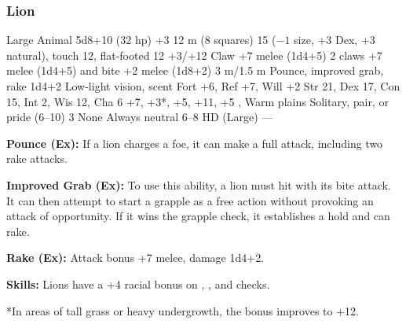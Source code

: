\subsubsection{Lion}
\begin{MonsterStats}
{Large Animal}
{5d8+10 (32 hp)}
{+3}
{12 m (8 squares)}
{15 ($-1$ size, +3 Dex, +3 natural), touch 12, flat-footed 12}
{+3/+12}
{Claw +7 melee (1d4+5)}
{2 claws +7 melee (1d4+5) and bite +2 melee (1d8+2)}
{3 m/1.5 m}
{Pounce, improved grab, rake 1d4+2}
{Low-light vision, scent}
{Fort +6, Ref +7, Will +2}
{Str 21, Dex 17, Con 15, Int 2, Wis 12, Cha 6}
{ +7,  +3*,  +5,  +11,  +5}
{, }
{Warm plains}
{Solitary, pair, or pride (6--10)}
{3}
{None}
{Always neutral}
{6--8 HD (Large)}
{---}
\end{MonsterStats}


\textbf{Pounce (Ex):} If a lion charges a foe, it can make a full attack, including two rake attacks.

\textbf{Improved Grab (Ex):} To use this ability, a lion must hit with its bite attack. It can then attempt to start a grapple as a free action without provoking an attack of opportunity. If it wins the grapple check, it establishes a hold and can rake.

\textbf{Rake (Ex):} Attack bonus +7 melee, damage 1d4+2.

\textbf{Skills:} Lions have a +4 racial bonus on , , and  checks.

*In areas of tall grass or heavy undergrowth, the  bonus improves to +12.

